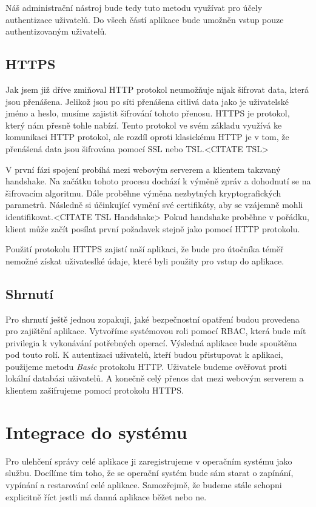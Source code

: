     Náš administrační nástroj bude tedy tuto metodu využívat pro účely authentizace uživatelů. Do všech částí aplikace bude umožněn vstup pouze authentizovaným uživatelů.

    \subsection{HTTPS}
    \label{https}
    Jak jsem již dříve zmiňoval HTTP protokol neumožňuje nijak šifrovat data, která jsou přenášena. Jelikož jsou po síti přenášena citlivá data jako je uživatelské jméno a heslo, musíme zajistit šifrování tohoto přenosu. HTTPS je protokol, který nám přesně tohle nabízí. Tento protokol ve svém základu využívá ke komunikaci HTTP protokol, ale rozdíl oproti klasickému HTTP je v tom, že přenášená data jsou šifrována pomocí SSL nebo TSL.<CITATE TSL>

    V první fázi spojení probíhá mezi webovým serverem a klientem takzvaný handshake. Na začátku tohoto procesu dochází k výměně zpráv a dohodnutí se na šifrovacím algoritmu. Dále proběhne výměna nezbytných kryptografických parametrů. Následně si účinkující vymění své certifikáty, aby se vzájemně mohli identifikovat.<CITATE TSL Handshake> Pokud handshake proběhne v pořádku, klient může začít posílat první požadavek stejně jako pomocí HTTP protokolu.

    Použití protokolu HTTPS zajistí naší aplikaci, že bude pro útočníka téměř nemožné získat uživateslké údaje, které byli použity pro vstup do aplikace.
    \subsection{Shrnutí}
    Pro shrnutí ještě jednou zopakuji, jaké bezpečnostní opatření budou provedena pro zajištění aplikace. Vytvoříme systémovou roli pomocí RBAC, která bude mít privilegia k vykonávání potřebných operací. Výsledná aplikace bude spouštěna pod touto rolí. K autentizaci uživatelů, kteří budou přistupovat k aplikaci, použijeme metodu \emph{Basic} protokolu HTTP. Uživatele budeme ověřovat proti lokální databázi uživatelů. A konečně celý přenos dat mezi webovým serverem a klientem zašifrujeme pomocí protokolu HTTPS.

\section{Integrace do systému}
Pro ulehčení správy celé aplikace ji zaregistrujeme v operačním systému jako službu. Docílíme tím toho, že se operační systém bude sám starat o zapínání, vypínání a restarování celé aplikace. Samozřejmě, že budeme stále schopni explicitně říct jestli má danná aplikace běžet nebo ne.


